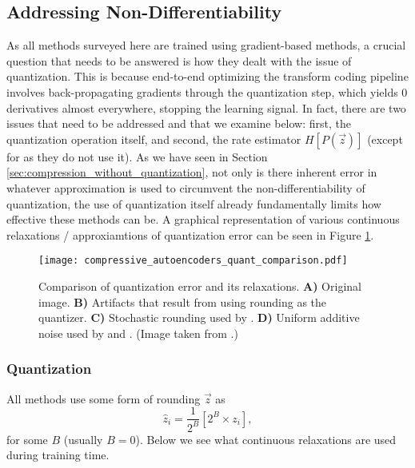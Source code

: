 \subsection{Addressing Non-Differentiability}
\label{sec:comp_quant}
\par
As all methods surveyed here are trained using gradient-based methods, a crucial
question that needs to be answered is how they dealt with the issue of
quantization. This is because end-to-end optimizing the transform coding
pipeline involves back-propagating gradients through the quantization step, which
yields 0 derivatives almost everywhere, stopping the learning signal.
In fact, there are two issues that need to be addressed and that we examine
below: first, the quantization operation itself, and second,
the rate estimator $H[P(\vec{z})]$ (except for \cite{rippel2017real} as they do
not use it). As we have
seen in Section \ref{sec:compression_without_quantization}, not only is there
inherent error in whatever approximation is used to circumvent the
non-differentiability of quantization, the use of quantization itself already
fundamentally limits how
effective these methods can be. A graphical representation of various continuous
relaxations / approxiamtions of quantization error can be seen in Figure
\ref{fig:quantization_models}. 
\begin{figure}
  \centering 
  \texttt{[image: compressive\_autoencoders\_quant\_comparison.pdf]}
  \caption[Comparison of quantization error and its relaxations.]
  {Comparison of quantization error and its relaxations. \textbf{A)}
    Original image. \textbf{B)} Artifacts that result from using rounding as the
    quantizer. \textbf{C)} Stochastic rounding used by \cite{toderici2017full}.
    \textbf{D)} Uniform additive noise used by \cite{balle2016end} and
    \cite{balle2018variational}. (Image taken from \cite{theis2017lossy}.)}
  \label{fig:quantization_models}
 \end{figure}

\subsubsection{Quantization}
\par
All methods use some form of rounding $\vec{z}$ as
\begin{equation}
\label{eq:quantization_step}
  \hat{z}_i = \frac{1}{2^B}\left[2^B \times z_i\right], 
\end{equation}
for some $B$ (usually $B = 0$). Below we see what continuous relaxations are used
during training time.
 
